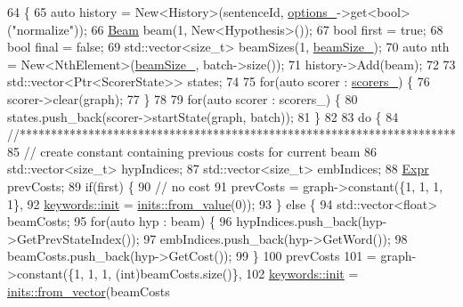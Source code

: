 \begin{DoxyCode}
64                                              \{
65     \textcolor{keyword}{auto} history = New<History>(sentenceId, \hyperlink{classmarian_1_1BeamSearch_a10153afbb751f39572a14bafb141225c}{options\_}->get<\textcolor{keywordtype}{bool}>(\textcolor{stringliteral}{"normalize"}));
66     \hyperlink{namespacemarian_aebdf5ddcd9e7774939696be6e1ceb8f0}{Beam} beam(1, New<Hypothesis>());
67     \textcolor{keywordtype}{bool} first = \textcolor{keyword}{true};
68     \textcolor{keywordtype}{bool} \textcolor{keyword}{final} = \textcolor{keyword}{false};
69     std::vector<size\_t> beamSizes(1, \hyperlink{classmarian_1_1BeamSearch_ad8c2a3f3b25c4a40d3e79f242e11e963}{beamSize\_});
70     \textcolor{keyword}{auto} nth = New<NthElement>(\hyperlink{classmarian_1_1BeamSearch_ad8c2a3f3b25c4a40d3e79f242e11e963}{beamSize\_}, batch->size());
71     history->Add(beam);
72 
73     std::vector<Ptr<ScorerState>> states;
74 
75     \textcolor{keywordflow}{for}(\textcolor{keyword}{auto} scorer : \hyperlink{classmarian_1_1BeamSearch_a1253640d2177b832316cb1343bb4db03}{scorers\_}) \{
76       scorer->clear(graph);
77     \}
78 
79     \textcolor{keywordflow}{for}(\textcolor{keyword}{auto} scorer : scorers\_) \{
80       states.push\_back(scorer->startState(graph, batch));
81     \}
82 
83     \textcolor{keywordflow}{do} \{
84       \textcolor{comment}{//**********************************************************************}
85       \textcolor{comment}{// create constant containing previous costs for current beam}
86       std::vector<size\_t> hypIndices;
87       std::vector<size\_t> embIndices;
88       \hyperlink{namespacemarian_a498d8baf75b754011078b890b39c8e12}{Expr} prevCosts;
89       \textcolor{keywordflow}{if}(first) \{
90         \textcolor{comment}{// no cost}
91         prevCosts = graph->constant(\{1, 1, 1, 1\},
92                                     \hyperlink{namespacemarian_1_1keywords_afdd3807e3d6fe2bc979d11fa0cf3ee3e}{keywords::init} = 
      \hyperlink{namespacemarian_1_1inits_a03723a199ab72a38a13b2b8644e8e1c2}{inits::from\_value}(0));
93       \} \textcolor{keywordflow}{else} \{
94         std::vector<float> beamCosts;
95         \textcolor{keywordflow}{for}(\textcolor{keyword}{auto} hyp : beam) \{
96           hypIndices.push\_back(hyp->GetPrevStateIndex());
97           embIndices.push\_back(hyp->GetWord());
98           beamCosts.push\_back(hyp->GetCost());
99         \}
100         prevCosts
101             = graph->constant(\{1, 1, 1, (int)beamCosts.size()\},
102                               \hyperlink{namespacemarian_1_1keywords_afdd3807e3d6fe2bc979d11fa0cf3ee3e}{keywords::init} = \hyperlink{namespacemarian_1_1inits_ab9566318ddbacd376c74cdbdfac091e4}{inits::from\_vector}(beamCosts

\end{DoxyCode}
